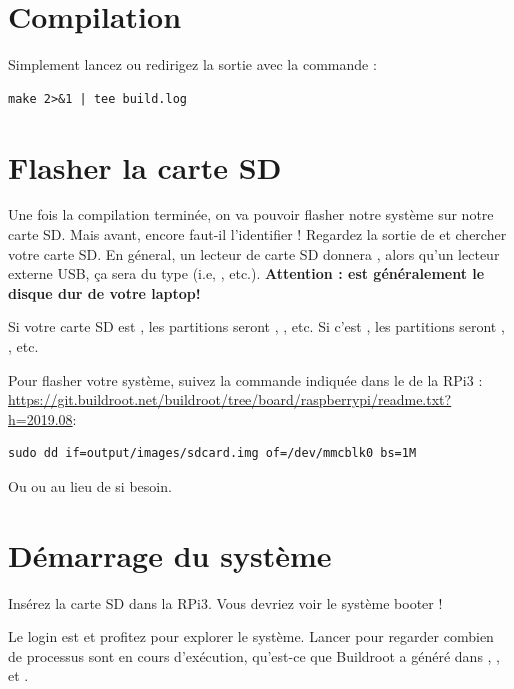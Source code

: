 \section{Compilation}

Simplement lancez  ou redirigez la sortie avec la commande
:

\begin{verbatim}
make 2>&1 | tee build.log
\end{verbatim}

\section{Flasher la carte SD}

Une fois la compilation terminée, on va pouvoir flasher notre système
sur notre carte SD. Mais avant, encore faut-il l'identifier !
Regardez la sortie de  et
chercher votre carte SD. En géneral, un lecteur de carte SD donnera
, alors qu'un lecteur externe USB, ça sera du type
 (i.e, , etc.). {\bf Attention :
   est généralement le disque dur de votre laptop!}

Si votre carte SD est , les partitions seront
, , etc. Si c'est ,
les partitions seront , , etc.

Pour flasher votre système, suivez la commande indiquée dans le 
de la RPi3 : \url{https://git.buildroot.net/buildroot/tree/board/raspberrypi/readme.txt?h=2019.08}: \\

\begin{verbatim}
sudo dd if=output/images/sdcard.img of=/dev/mmcblk0 bs=1M
\end{verbatim}

Ou  ou  au lieu de  si besoin.

\section{Démarrage du système}

Insérez la carte SD dans la RPi3. Vous devriez voir le système booter !

Le login est  et profitez pour explorer le système. Lancer
 pour regarder combien de processus sont en cours d'exécution,
qu'est-ce que Buildroot a généré dans , , 
et .


